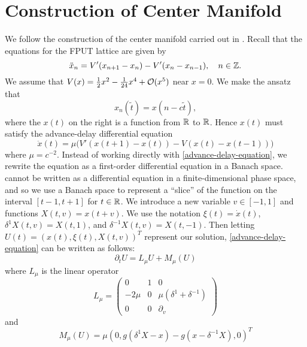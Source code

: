 \section{Construction of Center Manifold}
We follow the construction of the center manifold carried out in \cite{iooss2000travelling}. Recall that the equations for the FPUT lattice are given by
\begin{equation}\label{fput-lattice-odes}
	\ddot x_n = V'(x_{n+1} - x_n) - V'(x_n - x_{n-1}), \quad n\in\mathbb{Z}.
\end{equation}
We assume that \(V(x) = \frac 12 x^2 - \frac 1 {24} x^4 + \mathcal{O}(x^5)\) near \(x=0\). We make the ansatz that 
\begin{equation}
	x_n(\tilde t) = x(n-c\tilde t),
\end{equation}
where the \(x(t)\) on the right is a function from \(\mathbb{R}\) to \(\mathbb{R}\). Hence \(x(t)\) must satisfy the advance-delay differential equation
\begin{equation}\label{advance-delay-equation}
	\ddot x (t) = \mu \Big(V'(x(t+1) - x(t)) - V(x(t) - x(t-1)) \Big)
\end{equation}
where \(\mu = c^{-2}\). Instead of working directly with \cref{advance-delay-equation}, we rewrite the equation as a first-order differential equation in a Banach space.  cannot be written as a differential equation in a finite-dimensional phase space, and so we use a Banach space to represent a ``slice'' of the function on the interval \([t-1,t+1]\) for \(t\in\mathbb{R}\). We introduce a new variable \(v\in[-1,1]\) and functions \(X(t,v) = x(t+v)\). We use the notation \(\xi(t) = \dot x(t)\), \(\delta^1X(t,v) = X(t,1)\), and \(\delta^{-1} X(t,v) = X(t,-1)\). Then letting \(U(t) = (x(t), \xi(t), X(t,v))^T\) represent our solution, \cref{advance-delay-equation} can be written as follows:
\begin{equation}\label{first-order-abstract-ode}
	\partial_t U = L_\mu U + M_\mu (U)
\end{equation}
where \(L_\mu\) is the linear operator
\begin{equation}
	L_\mu = \begin{pmatrix}
		0 & 1 & 0\\
		-2\mu & 0 & \mu(\delta^1 + \delta^{-1}) \\
		0 & 0 & \partial_v
	\end{pmatrix}
\end{equation}
and 
\begin{equation}
	M_\mu(U) = \mu (0, g(\delta^1X -x) - g(x- \delta^{-1} X), 0)^T
\end{equation}
